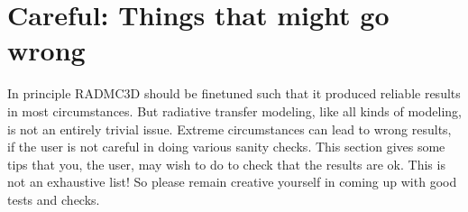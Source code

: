 \documentclass[letterpaper,10pt,english]{sphinxmanual}
\begin{document}
\section{Careful: Things that might go wrong}
\label{\detokenize{tipsandtricks:careful-things-that-might-go-wrong}}\label{\detokenize{tipsandtricks:sec-things-going-wrong}}
In principle RADMC\sphinxhyphen{}3D should be fine\sphinxhyphen{}tuned such that it produced reliable
results in most circumstances. But radiative transfer modeling, like all
kinds of modeling, is not an entirely trivial issue. Extreme circumstances
can lead to wrong results, if the user is not careful in doing various
sanity checks. This section gives some tips that you, the user, may wish
to do to check that the results are ok. This is not an exhaustive list!
So please remain creative yourself in coming up with good tests and checks.
\end{document}
